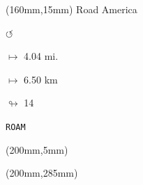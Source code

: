 \begin{textblock*}{40mm}(160mm,15mm)%
Road America
\par \Huge$\circlearrowleft$
\Large
\par$\mapsto$ 4.04 mi.
\par$\mapsto$ 6.50 km
\par$\looparrowright$ 14
\par\hfill\tiny\tt ROAM\\
\end{textblock*}
\begin{textblock*}{20mm}(200mm,5mm)%
\fbox{\thepage}
\end{textblock*}
\begin{textblock*}{20mm}(200mm,285mm)%
\fbox{\thepage}
\end{textblock*}
\null\newpage

